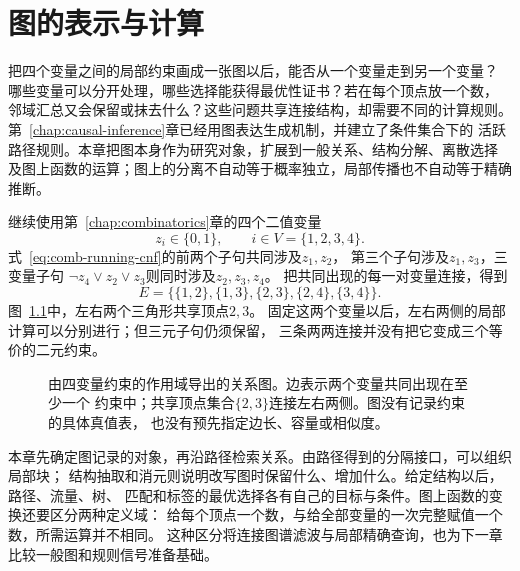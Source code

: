 \chapter{图的表示与计算}
\label{chap:graph-theory}

把四个变量之间的局部约束画成一张图以后，能否从一个变量走到另一个变量？
哪些变量可以分开处理，哪些选择能获得最优性证书？若在每个顶点放一个数，
邻域汇总又会保留或抹去什么？这些问题共享连接结构，却需要不同的计算规则。
第~\ref{chap:causal-inference}章已经用图表达生成机制，并建立了条件集合下的
活跃路径规则。本章把图本身作为研究对象，扩展到一般关系、结构分解、离散选择
及图上函数的运算；图上的分离不自动等于概率独立，局部传播也不自动等于精确推断。

继续使用第~\ref{chap:combinatorics}章的四个二值变量
\[
  z_i\in\{0,1\},\qquad i\in V=\{1,2,3,4\}.
\]
式~\eqref{eq:comb-running-cnf}的前两个子句共同涉及\(z_1,z_2\)，
第三个子句涉及\(z_1,z_3\)，三变量子句
\(\neg z_4\lor z_2\lor z_3\)则同时涉及\(z_2,z_3,z_4\)。
把共同出现的每一对变量连接，得到
\begin{equation}
  E=\bigl\{\{1,2\},\{1,3\},\{2,3\},\{2,4\},\{3,4\}\bigr\}.
  \label{eq:graph-theory-running-edges}
\end{equation}
图~\ref{fig:graph-theory-running-graph}中，左右两个三角形共享顶点\(2,3\)。
固定这两个变量以后，左右两侧的局部计算可以分别进行；但三元子句仍须保留，
三条两两连接并没有把它变成三个等价的二元约束。

\begin{figure}[htbp]
  \centering
  \caption{由四变量约束的作用域导出的关系图。边表示两个变量共同出现在至少一个
  约束中；共享顶点集合\(\{2,3\}\)连接左右两侧。图没有记录约束的具体真值表，
  也没有预先指定边长、容量或相似度。}
  \label{fig:graph-theory-running-graph}
\end{figure}

本章先确定图记录的对象，再沿路径检索关系。由路径得到的分隔接口，可以组织局部块；
结构抽取和消元则说明改写图时保留什么、增加什么。给定结构以后，路径、流量、树、
匹配和标签的最优选择各有自己的目标与条件。图上函数的变换还要区分两种定义域：
给每个顶点一个数，与给全部变量的一次完整赋值一个数，所需运算并不相同。
这种区分将连接图谱滤波与局部精确查询，也为下一章比较一般图和规则信号准备基础。

